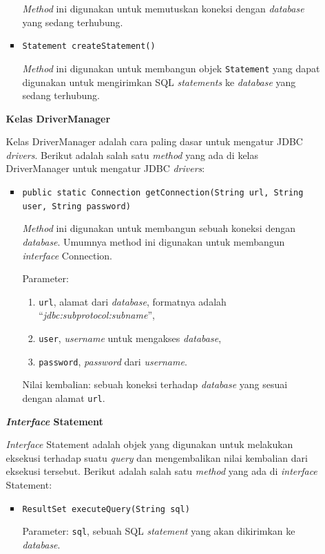 \documentclass[a4paper,twoside]{article}
\begin{document}
\begin{enumerate}
\begin{itemize}
\begin{itemize}
	\textit{Method} ini digunakan untuk memutuskan koneksi dengan \textit{database} yang sedang terhubung.
	
	\item \texttt{Statement createStatement()}
	
	\textit{Method} ini digunakan untuk membangun objek \texttt{Statement} yang dapat digunakan untuk mengirimkan SQL \textit{statements} ke \textit{database} yang sedang terhubung.
\end{itemize}

\textbf{Kelas DriverManager}

Kelas DriverManager adalah cara paling dasar untuk mengatur JDBC \textit{drivers}\cite{javadocumentation}. Berikut adalah salah satu \textit{method} yang ada di kelas DriverManager untuk mengatur JDBC \textit{drivers}:
\begin{itemize}
	\item \texttt{public static Connection getConnection(String url, String user, String password)}
	
	\textit{Method} ini digunakan untuk membangun sebuah koneksi dengan \textit{database}. Umumnya method ini digunakan untuk membangun \textit{interface} Connection.
	
	Parameter:
	\begin{enumerate}
		\item \texttt{url}, alamat dari \textit{database}, formatnya adalah ``\textit{jdbc:\textit{subprotocol}:\textit{subname}}'',
		\item \texttt{user}, \textit{username} untuk mengakses \textit{database},
		\item \texttt{password}, \textit{password} dari \textit{username}.
	\end{enumerate}
	
	Nilai kembalian: sebuah koneksi terhadap \textit{database} yang sesuai dengan alamat \texttt{url}.
\end{itemize}

\textbf{\textit{Interface} Statement}

\textit{Interface} Statement adalah objek yang digunakan untuk melakukan eksekusi terhadap suatu \textit{query} dan mengembalikan nilai kembalian dari eksekusi tersebut\cite{javadocumentation}. Berikut adalah salah satu \textit{method} yang ada di \textit{interface} Statement:
\begin{itemize}
	\item \texttt{ResultSet executeQuery(String sql)}
	
	Parameter: \texttt{sql}, sebuah SQL \textit{statement} yang akan dikirimkan ke \textit{database}.
	

\end{itemize}
\end{itemize}
\end{enumerate}
\end{document}
